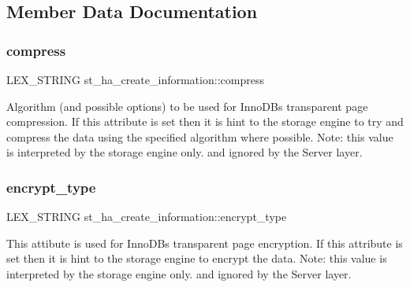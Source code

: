 \subsection{Member Data Documentation}
\mbox{\label{structst__ha__create__information_add80228cafe26423ea414960136cea53}} 
\subsubsection{\texorpdfstring{compress}{compress}}
{\footnotesize\ttfamily L\+E\+X\+\_\+\+S\+T\+R\+I\+NG st\+\_\+ha\+\_\+create\+\_\+information\+::compress}

Algorithm (and possible options) to be used for Inno\+DB\textquotesingle{}s transparent page compression. If this attribute is set then it is hint to the storage engine to try and compress the data using the specified algorithm where possible. Note\+: this value is interpreted by the storage engine only. and ignored by the Server layer. \mbox{\label{structst__ha__create__information_a99d5e36674a3d07fa626989b9c52d204}} 
\subsubsection{\texorpdfstring{encrypt\+\_\+type}{encrypt\_type}}
{\footnotesize\ttfamily L\+E\+X\+\_\+\+S\+T\+R\+I\+NG st\+\_\+ha\+\_\+create\+\_\+information\+::encrypt\+\_\+type}

This attibute is used for Inno\+DB\textquotesingle{}s transparent page encryption. If this attribute is set then it is hint to the storage engine to encrypt the data. Note\+: this value is interpreted by the storage engine only. and ignored by the Server layer. \mbox{\label{structst__ha__create__information_a2fd611ab0e3c6de92e58f50ca56efd76}} 
